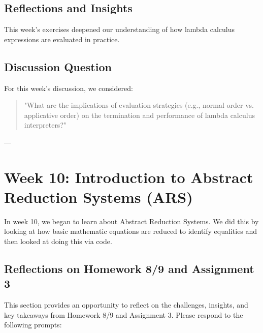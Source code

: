 \documentclass{article}
\begin{document}
\subsection*{Reflections and Insights}

This week's exercises deepened our understanding of how lambda calculus expressions are evaluated in practice. 

\subsection*{Discussion Question}

For this week's discussion, we considered:

\begin{quote}
\small
"What are the implications of evaluation strategies (e.g., normal order vs. applicative order) on the termination and performance of lambda calculus interpreters?"
\end{quote}

---
\section{Week 10: Introduction to Abstract Reduction Systems (ARS)}
\label{sec:week10}

In week 10, we began to learn about Abstract Reduction Systems. We did this by looking at how basic mathematic equations are reduced to identify equalities and then looked at doing this via code.

\subsection*{Reflections on Homework 8/9 and Assignment 3}

This section provides an opportunity to reflect on the challenges, insights, and key takeaways from Homework 8/9 and Assignment 3. Please respond to the following prompts:
\end{document}
